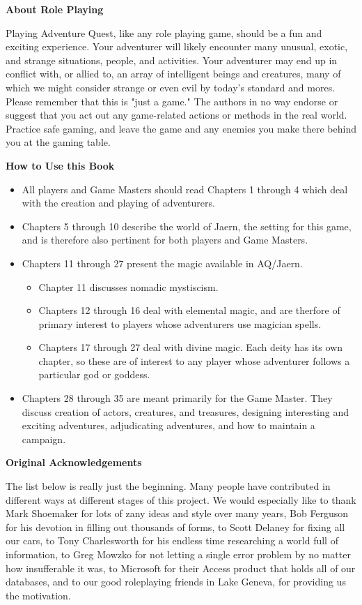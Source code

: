 \textbf{About Role Playing}

Playing Adventure Quest, like any role playing game, should be a fun and exciting experience. Your adventurer will likely encounter many unusual, exotic, and strange situations, people, and activities. Your adventurer may end up in conflict with, or allied to, an array of intelligent beings and creatures, many of which we might consider strange or even evil by today’s standard and mores. Please remember that this is "just a game." The authors in no way endorse or suggest that you act out any game-related actions or methods in the real world. Practice safe gaming, and leave the game and any enemies you make there behind you at the gaming table.

\textbf{How to Use this Book}
\begin{itemize}
\item All players and Game Masters should read Chapters 1 through 4 which deal with the creation and playing of adventurers.
\item Chapters 5 through 10 describe the world of Jaern, the setting for this game, and is therefore also pertinent for both players and Game Masters.
\item Chapters 11 through 27 present the magic available in AQ/Jaern. 
\begin{itemize}
\item Chapter 11 discusses nomadic mystiscism. 
\item Chapters 12 through 16 deal with elemental magic, and are therfore of primary interest to players whose adventurers use magician spells.
\item Chapters 17 through 27 deal with divine magic. Each deity has its own chapter, so these are of interest to any player whose adventurer follows a particular god or goddess.
\end{itemize}
\item Chapters 28 through 35 are meant primarily for the Game Master. They discuss creation of actors, creatures, and treasures, designing interesting and exciting adventures, adjudicating adventures, and how to maintain a campaign.
\end{itemize}

\textbf{Original Acknowledgements}

The list below is really just the beginning. Many people have contributed in different ways at different stages of this project. We would especially like to thank Mark Shoemaker for lots of zany ideas and style over many years, Bob Ferguson for his devotion in filling out thousands of forms, to Scott Delaney for fixing all our cars, to Tony Charlesworth for his endless time researching a world full of information, to Greg Mowzko for not letting a single error problem by no matter how insufferable it was, to Microsoft for their Access product that holds all of our databases, and to our good roleplaying friends in Lake Geneva, for providing us the motivation.

